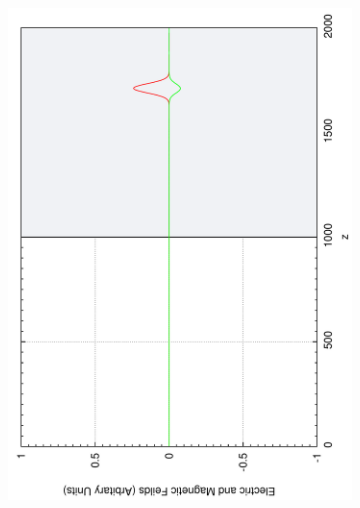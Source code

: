 \begin{figure}[ht]
        \centering
        \begin{subfigure}[ht]{0.45\textwidth}
                \centering
                \includegraphics[angle=270, width=\textwidth]{gaussnoise2.pdf}
        \end{subfigure}%
        ~
        \begin{subfigure}[ht]{0.45\textwidth}
                \centering

\end{subfigure}
\end{figure}
